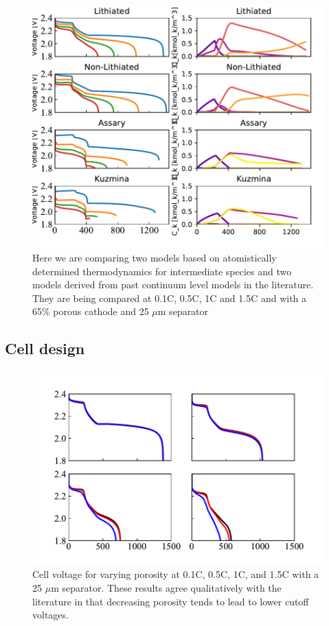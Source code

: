 \documentclass{elsarticle}
\begin{document}
\begin{center}
\begin{figure}
    \centering
    \includegraphics[width=\textwidth]{Figures/Vcell_mech_comp.pdf}
    \caption{Here we are comparing two models based on atomistically determined thermodynamics for intermediate species and two models derived from past continuum level models in the literature. They are being compared at 0.1C, 0.5C, 1C and 1.5C and with a 65\% porous cathode and 25 $\mu$m separator}
    \label{fig:mechanismcomparisonvoltage}
\end{figure}
\end{center}

\subsection{Cell design}

\begin{center}
\begin{figure}
    \centering
    \includegraphics[width=\textwidth]{Figures/Vcell_25um_sep.pdf}
    \caption{Cell voltage for varying porosity at 0.1C, 0.5C, 1C, and 1.5C with a 25 $\mu$m separator. These results agree qualitatively with the literature in that decreasing porosity tends to lead to lower cutoff voltages.}
    \label{fig:porositystudy25umsep}
\end{figure}
\end{center}
\end{document}
